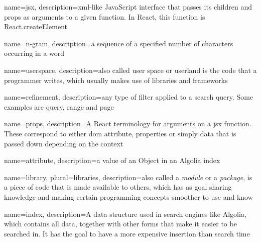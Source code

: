 
{
  name=jsx,
  description={\acrshort{xml}-like JavaScript interface that passes its children and props as arguments to a given function. In React, this function is React.createElement}
}
 
{
  name={n-gram},
  description={a sequence of a specified number of characters occurring in a word\cite{kimbrell1988searching}~}
}
 
{
  name=userspace,
  description={also called user space or userland is the code that a programmer writes, which usually makes use of libraries and frameworks}
}

{
  name=refinement,
  description={any type of filter applied to a search query. Some examples are query, range and page}
}

{
  name=props,
  description={A React terminology for arguments on a \gls{jsx} function. These correspond to either \acrshort{dom} attribute, properties or simply data that is passed down depending on the context}
}

{
  name=attribute,
  description={a value of an Object in an Algolia index}
}

{
  name=library,
  plural=libraries,
  description={also called a \emph{module} or a \emph{package}, is a piece of code that is made available to others, which has as goal sharing knowledge and making certain programming concepts smoother to use and know}
}

{
  name=index,
  description={A data structure used in search engines like Algolia, which contains all data, together with other forms that make it easier to be searched in. It has the goal to have a more expensive insertion than search time}
}

